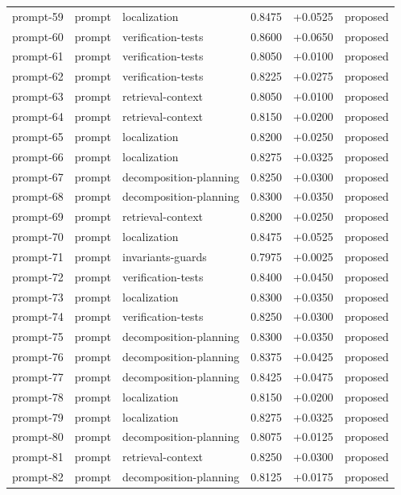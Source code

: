 \begin{center}
\begin{longtable}{llp{5.2cm}rrl}
prompt-59 & prompt & localization & 0.8475 & +0.0525 & proposed \\
prompt-60 & prompt & verification-tests & 0.8600 & +0.0650 & proposed \\
prompt-61 & prompt & verification-tests & 0.8050 & +0.0100 & proposed \\
prompt-62 & prompt & verification-tests & 0.8225 & +0.0275 & proposed \\
prompt-63 & prompt & retrieval-context & 0.8050 & +0.0100 & proposed \\
prompt-64 & prompt & retrieval-context & 0.8150 & +0.0200 & proposed \\
prompt-65 & prompt & localization & 0.8200 & +0.0250 & proposed \\
prompt-66 & prompt & localization & 0.8275 & +0.0325 & proposed \\
prompt-67 & prompt & decomposition-planning & 0.8250 & +0.0300 & proposed \\
prompt-68 & prompt & decomposition-planning & 0.8300 & +0.0350 & proposed \\
prompt-69 & prompt & retrieval-context & 0.8200 & +0.0250 & proposed \\
prompt-70 & prompt & localization & 0.8475 & +0.0525 & proposed \\
prompt-71 & prompt & invariants-guards & 0.7975 & +0.0025 & proposed \\
prompt-72 & prompt & verification-tests & 0.8400 & +0.0450 & proposed \\
prompt-73 & prompt & localization & 0.8300 & +0.0350 & proposed \\
prompt-74 & prompt & verification-tests & 0.8250 & +0.0300 & proposed \\
prompt-75 & prompt & decomposition-planning & 0.8300 & +0.0350 & proposed \\
prompt-76 & prompt & decomposition-planning & 0.8375 & +0.0425 & proposed \\
prompt-77 & prompt & decomposition-planning & 0.8425 & +0.0475 & proposed \\
prompt-78 & prompt & localization & 0.8150 & +0.0200 & proposed \\
prompt-79 & prompt & localization & 0.8275 & +0.0325 & proposed \\
prompt-80 & prompt & decomposition-planning & 0.8075 & +0.0125 & proposed \\
prompt-81 & prompt & retrieval-context & 0.8250 & +0.0300 & proposed \\
prompt-82 & prompt & decomposition-planning & 0.8125 & +0.0175 & proposed \\

\end{longtable}
\end{center}
